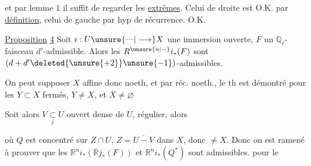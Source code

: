 
et  par lemme 1 il suffit de regarder les \uline{extrêmes}. Celui de droite est O.K.  par \uline{définition}, celui de gauche par hyp de récurrence. \quad O.K.

\uline{Proposition} \uline{4} \quad Soit $i:U\unsure{\text{---}|\longrightarrow}X$ une immersion ouverte,  $F$ un  $\mathbb Q_\ell$-faisceau $d'$-admissible. Alors les $R^{\unsure{n|-}}i_*(F)$ sont $(d+d'\deleted{\unsure{+2}}\unsure{-1})$-admissibles.

 

On peut supposer $X$ affine donc noeth, et par réc. noeth.,  le th est démontré pour les $Y\subset X$ fermés, $Y\neq X$, et $X\neq\varnothing$

Soit alors $V\underset{j}{\subset}U$ ouvert dense de $U$, régulier, alors


où $Q$ est concentré sur $Z\cap U$, $Z=\overline{U-V}$ \uline{} dans $X$, donc $\neq X$. Donc on est ramené à prouver que les $\mathbb R^n i_*(\mathbb R j_*(F))$ et $\mathbb R^n i_*(Q^*)$ sont admissibles. pour le

